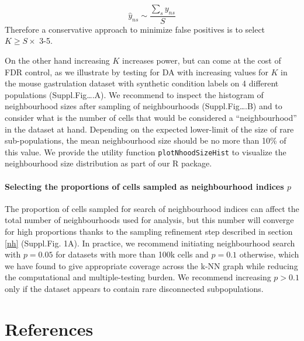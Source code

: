 \documentclass[
]{article}
\begin{document}
\[
\hat{y}_{ns} \sim \frac{\sum_s y_{ns}}{S}
\]
Therefore a conservative approach to minimize false positives is to select \(K \geq S \times\) 3-5.

On the other hand increasing \(K\) increases power, but can come at the cost of FDR control, as we illustrate by testing for DA with increasing values for \(K\) in the mouse gastrulation dataset with synthetic condition labels on 4 different populations (Suppl.Fig\ldots.A). We recommend to inspect the histogram of neighbourhood sizes after sampling of neighbourhoods (Suppl.Fig\ldots.B) and to consider what is the number of cells that would be considered a ``neighbourhood'' in the dataset at hand. Depending on the expected lower-limit of the size of rare sub-populations, the mean neighbourhood size should be no more than 10\% of this value. We provide the utility function \texttt{plotNhoodSizeHist} to visualize the neighbourhood size distribution as part of our R package.

\hypertarget{selecting-the-proportions-of-cells-sampled-as-neighbourhood-indices-p}{%
\paragraph*{\texorpdfstring{Selecting the proportions of cells sampled as neighbourhood indices \(p\)}{Selecting the proportions of cells sampled as neighbourhood indices p}}\label{selecting-the-proportions-of-cells-sampled-as-neighbourhood-indices-p}}

The proportion of cells sampled for search of neighbourhood indices can affect the total number of neighbourhoods used for analysis, but this number will converge for high proportions thanks to the sampling refinement step described in section \ref{nh} (Suppl.Fig. 1A). In practice, we recommend initiating neighbourhood search with \(p=0.05\) for datasets with more than 100k cells and \(p=0.1\) otherwise, which we have found to give appropriate coverage across the k-NN graph while reducing the computational and multiple-testing burden. We recommend increasing \(p > 0.1\) only if the dataset appears to contain rare disconnected subpopulations.

\hypertarget{references}{%
\section*{References}\label{references}}
\end{document}

